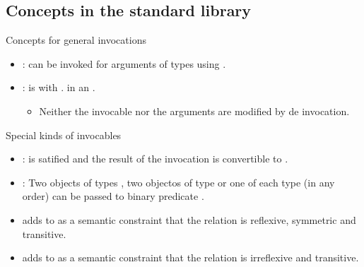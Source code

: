 \subsection{Concepts in the standard library}

\begin{frame}[t,fragile]{Concepts for general invocations}
\begin{itemize}
  \item {}:
         can be invoked for arguments of types 
        using .

  \item {}:
         is  with .
        in an .
          \begin{itemize}
            \item Neither the invocable nor the arguments are modified by de invocation.
          \end{itemize}
\end{itemize}
\end{frame}

\begin{frame}[t,fragile]{Special kinds of invocables}
\begin{itemize}
  \item {}:
         is satified and the result
        of the invocation is convertible to .   

  \item {}:
        Two objects of types , two objectos of type  or one of each type
        (in any order) can be passed to binary predicate .
            
  \item {} 
        adds to  as a semantic constraint that the
            relation is reflexive, symmetric and transitive.

  \item {} 
        adds to  as a semantic constraint that the
            relation is irreflexive and transitive.
\end{itemize}
\end{frame}

